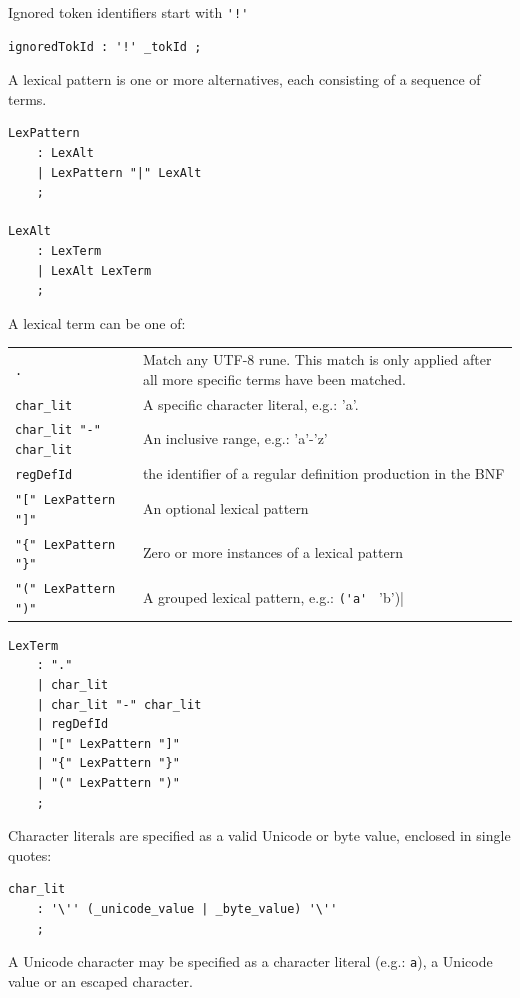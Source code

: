 \documentclass[12pt]{article}
\begin{document}
Ignored token identifiers start with \verb|'!'|

\begin{Verbatim}[frame=single]
ignoredTokId : '!' _tokId ;
\end{Verbatim}

A lexical pattern is one or more alternatives, each consisting of a sequence of terms. 

\begin{Verbatim}[frame=single]
LexPattern     
    : LexAlt
    | LexPattern "|" LexAlt
    ;

LexAlt     
    : LexTerm
    | LexAlt LexTerm
    ;
\end{Verbatim}

A lexical term can be one of:

\begin{longtable}{lp{12cm}}
	\verb|.| & Match any UTF-8 rune. This match is only applied after all more specific terms have been matched. \\
	\verb|char_lit| & A specific character literal, e.g.: 'a'. \\
	\verb|char_lit "-" char_lit| & An inclusive range, e.g.: 'a'-'z' \\
	\verb|regDefId| & the identifier of a regular definition production in the BNF \\
	\verb|"[" LexPattern "]"| & An optional lexical pattern \\
	\verb|"{" LexPattern "}"| & Zero or more instances of a lexical pattern \\
	\verb|"(" LexPattern ")"| & A grouped lexical pattern, e.g.: \verb|('a' | 'b')| \\
\end{longtable}

\begin{Verbatim}[frame=single]
LexTerm 
    : "."
    | char_lit
    | char_lit "-" char_lit
    | regDefId
    | "[" LexPattern "]"
    | "{" LexPattern "}"
    | "(" LexPattern ")"
    ;
\end{Verbatim}

Character literals are specified as a valid Unicode or byte value, enclosed in single quotes:

\begin{Verbatim}[frame=single]
char_lit
    : '\'' (_unicode_value | _byte_value) '\'' 
    ;
\end{Verbatim}

A Unicode character may be specified as a character literal (e.g.: \verb'a'), a Unicode value or an escaped character.
\end{document}
